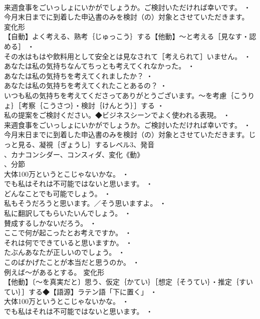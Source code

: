 \documentclass[8pt]{extreport}
\begin{document}
\begin{CJK}{UTF8}{min}
\\	来週食事をごいっしょにいかがでしょうか。ご検討いただければ幸いです。 ・
\\	今月末日までに到着した申込書のみを検討（の）対象とさせていただきます。	変化形 
\\	【自動】よく考える、熟考｛じゅっこう｝する【他動】～と考える［見なす・認める］ ・
\\	その水はもはや飲料用として安全とは見なされて［考えられて］いません。 ・
\\	あなたは私の気持ちなんてちっとも考えてくれなかった。 ・
\\	あなたは私の気持ちを考えてくれましたか？ ・
\\	あなたは私の気持ちを考えてくれたことあるの？ ・
\\	いつも私の気持ちを考えてくださってありがとうございます。～を考慮｛こうりょ｝［考察｛こうさつ｝・検討｛けんとう｝］する ・
\\	私の提案をご検討ください。◆ビジネスシーンでよく使われる表現。 ・
\\	来週食事をごいっしょにいかがでしょうか。ご検討いただければ幸いです。 ・
\\	今月末日までに到着した申込書のみを検討（の）対象とさせていただきます。じっと見る、凝視｛ぎょうし｝するレベル3、発音
\\	、カナコンシダー、コンスィダ、変化《動》
\\	、分節
\\	大体100万というとこじゃないかな。 ・
\\	でも私はそれは不可能ではないと思います。 ・
\\	どんなことでも可能でしょう。 ・
\\	私もそうだろうと思います。／そう思いますよ。 ・
\\	私に翻訳してもらいたいんでしょう。 ・
\\	賛成するしかないだろう。 ・
\\	ここで何が起こったとお考えですか。 ・
\\	それは何でできていると思いますか。 ・
\\	たぶんあなたが正しいのでしょう。 ・
\\	このばかげたことが本当だと思うのか。 ・
\\	例えば～があるとする。	変化形 
\\	【他動】〔～を真実だと〕思う、仮定｛かてい｝［想定｛そうてい｝・推定｛すいてい｝］する◆【語源】ラテン語「下に置く」 ・
\\	大体100万というとこじゃないかな。 ・
\\	でも私はそれは不可能ではないと思います。 ・

\end{CJK}
\end{document}
